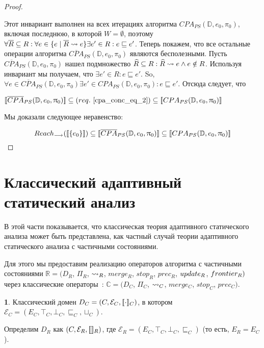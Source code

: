 \begin{proof}
\begin{enumerate}
\begin{itemize}
Этот инвариант выполнен на всех итерациях алгоритма $CPA_{PS}(\mathbb{D}, e_0, \pi_0)$, включая последнюю, в которой $W = \emptyset$, поэтому $\forall \overline{R} \subseteq R: \forall e \in \{e \mid \overline{R} \leadsto e\} \exists e' \in R : e \sqsubseteq e'$.
Теперь покажем, что все остальные операции алгоритма $\overline{CPA}_{PS}(\mathbb{D}, e_0, \pi_0)$ являются бесполезными.
Пусть $\overline{CPA}_{PS}(\mathbb{D}, e_0, \pi_0)$ нашел подмножество $\widehat{R} \subseteq R: \widehat{R} \leadsto e \land e \notin R$.
Используя инвариант мы получаем, что $\exists e' \in R: e \sqsubseteq e'$. So, $\forall e \in \overline{CPA}_{PS}(\mathbb{D}, e_0, \pi_0) \exists e' \in CPA_{PS}(\mathbb{D}, e_0, \pi_0): e \sqsubseteq e'$.
Отсюда следует, что

$[\![ \overline{CPA}_{PS}(\mathbb{D}, e_0, \uppi_0) ]\!] \subseteq (req.~\ref{cpa_conc_eq_2}) \subseteq [\![ CPA_{PS}(\mathbb{D}, e_0, \uppi_0) ]\!]$

\end{itemize}

\end{enumerate}
Мы доказали следующее неравенство:

$$Reach_{\longrightarrow}([\![ \{e_0\} ]\!]) \subseteq [\![ \overline{CPA}_{PS}(\mathbb{D}, e_0, \uppi_0) ]\!] \subseteq [\![ CPA_{PS}(\mathbb{D}, e_0, \uppi_0) ]\!]$$

\qedsymbol
\end{proof}

\section{Классический адаптивный статический анализ}
\label{sect_classic_cpa}

В этой части показывается, что классическая теория адаптивного статического анализа может быть представлена, как частный случай теории адаптивного статического анализа с частичными состояниями.

Для этого мы предоставим реализацию операторов алгоритма с частичными состояниями
$\mathbb{R}=(D_R$, $\Pi_R$, $\leadsto_R$, $merge_R$, $stop_R$, $prec_R$, $update_R$, $frontier_R)$
через классические операторы~\cite{Beyer08}: %
$\mathbb{C} = (D_C$, $\Pi_C$, $\leadsto_C$, $merge_C$, $stop_C$, $prec_C)$.

{\textbf 1.}
Классический домен $D_C=(C,\mathcal{E}_C, [\![ \cdot ]\!]_C)$, в котором
$\mathcal{E}_C=(E_C, \top_C, \bot_C, \sqsubseteq_C, \sqcup_C)$.

Определим $D_R$ как $(C,\mathcal{E}_R, [\![  ]\!]_R)$, где 
$\mathcal{E}_R = (E_C, \top_C, \bot_C, \sqsubseteq_C)$ (то есть, $E_R=E_C$).

